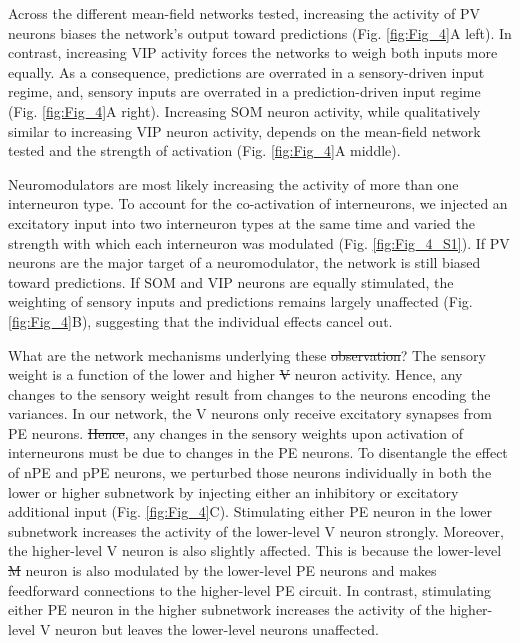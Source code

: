 \documentclass[10pt,a4paper]{article}
\providecommand{\DIFaddtex}[1]{{\protect\color{blue}\uwave{#1}}} %
\providecommand{\DIFdeltex}[1]{{\protect\color{red}\sout{#1}}}                      %
\providecommand{\DIFaddbegin}{} %
\providecommand{\DIFaddend}{} %
\providecommand{\DIFdelbegin}{} %
\providecommand{\DIFdelend}{} %
\providecommand{\DIFadd}[1]{\texorpdfstring{\DIFaddtex{#1}}{#1}} %
\providecommand{\DIFdel}[1]{\texorpdfstring{\DIFdeltex{#1}}{}} %
\newcommand{\DIFscaledelfig}{0.5}
\newlength{\DIFdelgraphicswidth} %
\newlength{\DIFdelgraphicsheight} %
\newcommand{\DIFaddincludegraphics}[2][]{{\color{blue}\fbox{\DIFOincludegraphics[#1]{#2}}}} %
\newcommand{\DIFdelincludegraphics}[2][]{%
\sbox{\DIFdelgraphicsbox}{\DIFOincludegraphics[#1]{#2}}%
\settoboxwidth{\DIFdelgraphicswidth}{\DIFdelgraphicsbox} %
\settoboxtotalheight{\DIFdelgraphicsheight}{\DIFdelgraphicsbox} %
\scalebox{\DIFscaledelfig}{%
\parbox[b]{\DIFdelgraphicswidth}{\usebox{\DIFdelgraphicsbox}\\[-\baselineskip] \rule{\DIFdelgraphicswidth}{0em}}\llap{\resizebox{\DIFdelgraphicswidth}{\DIFdelgraphicsheight}{%
\setlength{\unitlength}{\DIFdelgraphicswidth}%
\begin{picture}(1,1)%
\thicklines\linethickness{2pt} %
{\color[rgb]{1,0,0}\put(0,0){\framebox(1,1){}}}%
{\color[rgb]{1,0,0}\put(0,0){\line( 1,1){1}}}%
{\color[rgb]{1,0,0}\put(0,1){\line(1,-1){1}}}%
\end{picture}%
}\hspace*{3pt}}} %
} %
\DeclareRobustCommand{\DIFaddbegin}{\DIFOaddbegin \let\includegraphics\DIFaddincludegraphics} %
\DeclareRobustCommand{\DIFaddend}{\DIFOaddend \let\includegraphics\DIFOincludegraphics} %
\DeclareRobustCommand{\DIFdelbegin}{\DIFOdelbegin \let\includegraphics\DIFdelincludegraphics} %
\DeclareRobustCommand{\DIFdelend}{\DIFOaddend \let\includegraphics\DIFOincludegraphics} %
\begin{document}
Across the different mean-field networks tested, increasing the activity of PV neurons biases the network's output toward predictions (Fig. \ref{fig:Fig_4}A left). In contrast, increasing VIP activity forces the networks to weigh both inputs more equally. As a consequence, predictions are overrated in a sensory-driven input regime, and, sensory inputs are overrated in a prediction-driven input regime (Fig. \ref{fig:Fig_4}A right). Increasing SOM neuron activity, while qualitatively similar to increasing VIP neuron activity, depends on the mean-field network tested and the strength of activation (Fig. \ref{fig:Fig_4}A middle). 

Neuromodulators are most likely increasing the activity of more than one interneuron type. To account for the co-activation of interneurons, we injected an excitatory input into two interneuron types at the same time and varied the strength with which each interneuron was modulated (Fig. \ref{fig:Fig_4_S1}). If PV neurons are the major target of a neuromodulator, the network is still biased toward predictions. If SOM and VIP neurons are equally stimulated, the weighting of sensory inputs and predictions remains largely unaffected (Fig. \ref{fig:Fig_4}B), suggesting that the individual effects cancel out.

What are the network mechanisms underlying these \DIFdelbegin \DIFdel{observation}\DIFdelend \DIFaddbegin \DIFadd{observations}\DIFaddend ? The sensory weight is a function of the lower and higher \DIFdelbegin \DIFdel{V }\DIFdelend \DIFaddbegin \DIFadd{variance (V) }\DIFaddend neuron activity. Hence, any changes to the sensory weight result from changes to the neurons encoding the variances. In our network, the V neurons only receive excitatory synapses from PE neurons. \DIFdelbegin \DIFdel{Hence}\DIFdelend \DIFaddbegin \DIFadd{As a consequence}\DIFaddend , any changes in the sensory weights upon activation of interneurons must be due to changes in the PE neurons. To disentangle the effect of nPE and pPE neurons, we perturbed those neurons individually in both the lower or higher subnetwork by injecting either an inhibitory or excitatory additional input (Fig. \ref{fig:Fig_4}C).
Stimulating either PE neuron in the lower subnetwork increases the activity of the lower-level V neuron strongly. Moreover, the higher-level V neuron is also slightly affected. This is because the lower-level \DIFdelbegin \DIFdel{M }\DIFdelend \DIFaddbegin \DIFadd{memory }\DIFaddend neuron is also modulated by the lower-level PE neurons and makes feedforward connections to the higher-level PE circuit. In contrast, stimulating either PE neuron in the higher subnetwork increases the activity of the higher-level V neuron but leaves the lower-level neurons unaffected. 
\end{document}
